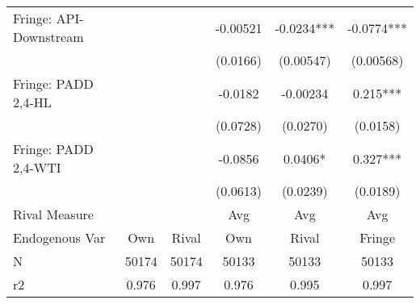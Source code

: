 {\begin{tabular}{l*{5}{c}}
\addlinespace
Fringe: API-Downstream&            &            & -0.00521   &  -0.0234***&  -0.0774***\\
                &            &            & (0.0166)   &(0.00547)   &(0.00568)   \\
\addlinespace
Fringe: PADD 2,4-HL&            &            &  -0.0182   & -0.00234   &    0.215***\\
                &            &            & (0.0728)   & (0.0270)   & (0.0158)   \\
\addlinespace
Fringe: PADD 2,4-WTI&            &            &  -0.0856   &   0.0406*  &    0.327***\\
                &            &            & (0.0613)   & (0.0239)   & (0.0189)   \\
\midrule
Rival Measure   &            &            &      Avg   &      Avg   &      Avg   \\
Endogenous Var  &      Own   &    Rival   &      Own   &    Rival   &   Fringe   \\
N               &    50174   &    50174   &    50133   &    50133   &    50133   \\
r2              &    0.976   &    0.997   &    0.976   &    0.995   &    0.997   \\
\bottomrule
\end{tabular}
}
